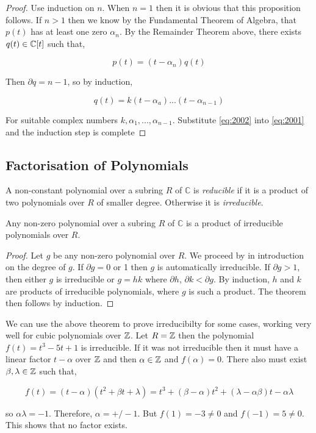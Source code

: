 \begin{proof}
    Use induction on $n$. When $n = 1$ then it is obvious that this proposition follows. If $n > 1$ then we know by the Fundamental Theorem of Algebra, that $p(t)$ has at least one zero $\alpha_n$. By the Remainder Theorem above, there exists $q(t) \in \mathbb C[t]$ such that,

\begin{equation} \label{eq:2001}
    p(t) = (t-\alpha_n) q(t)
\end{equation}
    
    Then $\partial q = n - 1$, so by induction,

\begin{equation} \label{eq:2002}
    q(t) = k(t-\alpha_a)...(t-\alpha_{n-1})
\end{equation}     
    
    For suitable complex numbers $k,\alpha_1,...,\alpha_{n-1}$. Substitute \ref{eq:2002} into \ref{eq:2001} and the induction step is complete
\end{proof}

\subsection{Factorisation of Polynomials}
\begin{definition}
     A non-constant polynomial over a subring $R$ of $\mathbb{C}$ is \textit{reducible} if it is a product of two polynomials over $R$ of smaller degree. Otherwise it is \textit{irreducible}.
\end{definition}

\begin{theorem}
    Any non-zero polynomial over a subring $R$ of $\mathbb{C}$ is a product of irreducible polynomials over $R$.
\end{theorem}

\begin{proof}
    Let $g$ be any non-zero polynomial over $R$. We proceed by in introduction on the degree of $g$. If $\partial g = 0$ or 1 then $g$ is automatically irreducible. If $\partial g > 1$, then either $g$ is irreducible or $g = hk$ where $\partial h$, $\partial k < \partial g$. By induction, $h$ and $k$ are products of irreducible polynomials, where $g$ is such a product. The theorem then follows by induction.
\end{proof}

\begin{example}
    We can use the above theorem to prove irreducibilty for some cases, working very well for cubic polynomials over $\mathbb Z$. Let $R = \mathbb Z$ then the polynomial $f(t) = t^3 -5 t + 1$ is irreducible. If it was not irreducible then it must have a linear factor $t - \alpha$ over $\mathbb Z$ and then $\alpha \in \mathbb Z$ and $f(\alpha) = 0$. There also must exist $\beta, \lambda \in \mathbb Z$ such that,

    $$
    f(t) = (t-\alpha)(t^2 + \beta t + \lambda) = t^3 + (\beta - \alpha)t^2 + (\lambda - \alpha \beta)t - \alpha \lambda
    $$

    so $\alpha \lambda = -1$. Therefore, $\alpha = +/- 1$. But $f(1) = -3 \neq 0$ and $f(-1) = 5 \neq 0$. This shows that no factor exists.
\end{example}

